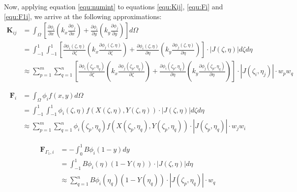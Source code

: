 \documentclass[letterpaper,10pt]{article}
\begin{document}
Now, applying equation \ref{equ:numint} to equations \ref{equ:Kij}, \ref{equ:Fi} and \ref{equ:F1i}, we arrive at the following approximations:
\begin{equation}
\label{equ:Kij_quad}
\begin{split}
	\mathbf{K}_{ij} &= \int_\Omega \left[ \frac{\partial \phi_i}{\partial x}\left(k_x\frac{\partial \phi_j}{\partial x}\right) + \frac{\partial \phi_i}{\partial y}\left(k_y\frac{\partial \phi_j}{\partial y}\right) \right]d\Omega \\
	&= \int_{-1}^1\int_{-1}^1 \left[ \frac{\partial \phi_i\left(\zeta,\eta\right)}{\partial \zeta}\left(k_x\frac{\partial \phi_j\left(\zeta,\eta\right)}{\partial \zeta}\right) + \frac{\partial \phi_i\left(\zeta,\eta\right)}{\partial \eta}\left(k_y\frac{\partial \phi_j\left(\zeta,\eta\right)}{\partial \eta}\right) \right]\cdot\left|J\left(\zeta,\eta\right)\right|d\zeta d\eta \\
	&\approx \sum_{p=1}^m\sum_{q=1}^n \left[\frac{\partial \phi_i\left(\zeta_p,\eta_q\right)}{\partial \zeta}\left(k_x\frac{\partial \phi_j\left(\zeta_p,\eta_q\right)}{\partial \zeta}\right) + \frac{\partial \phi_i\left(\zeta_p,\eta_q\right)}{\partial \eta}\left(k_y\frac{\partial \phi_j\left(\zeta_p,\eta_q\right)}{\partial \eta}\right) \right]\cdot\left|J\left(\zeta_i,\eta_j\right)\right|\cdot w_pw_q
\end{split}
\end{equation}

\begin{equation}
\label{equ:Fi_quad}
\begin{split}
	\mathbf{F}_i &= \int_\Omega \phi_if(x,y)d\Omega \\
	&= \int_{-1}^1\int_{-1}^1 \phi_i\left(\zeta,\eta\right)f\left(X(\zeta,\eta),Y(\zeta,\eta)\right)\cdot \left|J\left(\zeta,\eta\right)\right|d\zeta d\eta \\
	&\approx \sum_{p=1}^m\sum_{q=1}^n\phi_i\left(\zeta_p,\eta_q\right)f\left(X(\zeta_p,\eta_q),Y(\zeta_p,\eta_q)\right)\cdot \left|J\left(\zeta_p,\eta_q\right)\right| \cdot w_jw_i
\end{split}
\end{equation}

\begin{equation}
\label{equ:F1i_quad}
\begin{split}
	\mathbf{F}_{\Gamma_1,i} &= -\int_0^1 B \phi_i \left(1-y\right)dy \\
	&= \int_{-1}^1 B\phi_i\left(\eta\right)\left(1-Y(\eta)\right)\cdot \left|J\left(\zeta,\eta\right)\right|d\eta \\
	&\approx \sum_{q=1}^n B\phi_i\left(\eta_q\right)\left(1-Y(\eta_q)\right)\cdot \left|J\left(\zeta_p,\eta_q\right)\right|\cdot w_q
\end{split}
\end{equation}
\end{document}
